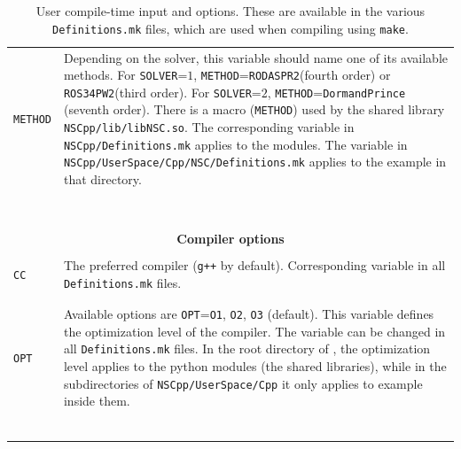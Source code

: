 \documentclass[11pt,a4paper]{article}
\begin{document}
\begin{table}[p]
\begin{tabular}{l l}
		{\tt METHOD}& \multirow{1}{12cm}{Depending on the solver, this variable should name one of its available methods. For {\tt SOLVER}=$1$, {\tt METHOD}={\tt RODASPR2}(fourth order) or {\tt ROS34PW2}(third order). For {\tt SOLVER}=$2$, {\tt METHOD}={\tt DormandPrince }(seventh order). There is a macro ({\tt METHOD}) used by the shared library {\tt NSCpp/lib/libNSC.so}. The corresponding variable in {\tt NSCpp/Definitions.mk} applies to the \PY modules. The variable in {\tt NSCpp/UserSpace/Cpp/NSC/Definitions.mk} applies to the example in that directory.}\\\\\\\\\\\\\\\\
		 		
		\hline\\[-0.4cm]
		
		\multicolumn{2}{c}{\bf Compiler options}  \\
		\hline\\[-0.4cm]
		
		{\tt CC} &  \multirow{1}{12cm}{The preferred \CPP compiler ({\tt g++} by default). Corresponding variable in all {\tt Definitions.mk} files.} \\\\
		\hline\\[-0.4cm]
		
		{\tt OPT} &  \multirow{1}{12cm}{Available options are {\tt OPT}={\tt O1}, {\tt O2}, {\tt O3} (default). This variable defines the optimization level of the compiler. The variable can be changed in all {\tt Definitions.mk} files. In the root directory of \nsc, the optimization level applies to the python modules (\ie the shared libraries), while in the subdirectories of {\tt NSCpp/UserSpace/Cpp} it only applies to example inside them.}   \\\\\\\\\\\\
		\hline\\[-0.4cm]

	\end{tabular}
	\caption{User compile-time input and options. These are available in the various {\tt Definitions.mk} files, which are used when compiling using {\tt make}.}
	\label{tab:compile_time-options}
\end{table}



\pagebreak
{}
                        
\end{document}
